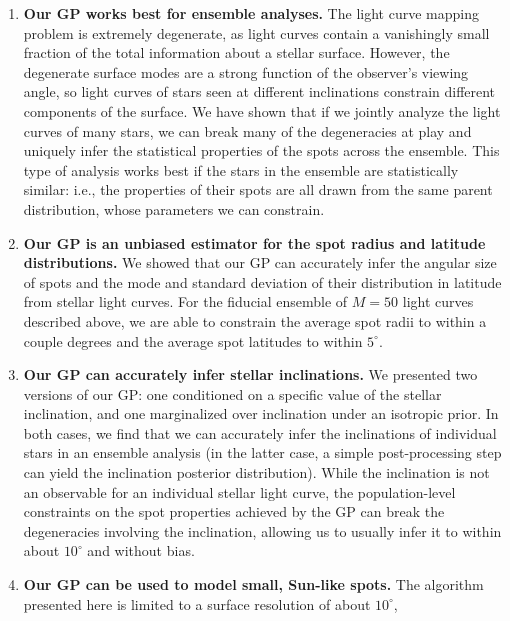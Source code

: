 \documentclass[modern]{aastex62}
\begin{document}
\begin{enumerate}
    \item \textbf{Our GP works best for ensemble analyses.} The light curve mapping
          problem is extremely degenerate, as light curves contain a vanishingly small
          fraction of the total information about a stellar surface. However, the
          degenerate surface modes are a strong function of the observer's viewing
          angle, so light curves of stars seen at different inclinations constrain
          different components of the surface. We have shown that if we jointly
          analyze the light curves of many stars,
          we can break many of the degeneracies at play and uniquely infer the
          statistical properties of the spots across the ensemble. This type
          of analysis works best if the stars in the ensemble are statistically
          similar: i.e., the properties of their spots are all drawn from the
          same parent distribution, whose parameters we can constrain.
    \item \textbf{Our GP is an unbiased estimator for the spot radius and
              latitude distributions.} We showed that our GP can accurately infer the
          angular size of spots and the mode and standard deviation of their
          distribution in latitude from stellar light curves. For the fiducial
          ensemble of $M = 50$ light curves described above, we are able to
          constrain the average spot radii to within a couple degrees and the
          average spot latitudes to within $5^\circ$.
    \item \textbf{Our GP can accurately infer stellar inclinations.} We presented
          two versions of our GP: one conditioned on a specific value of the stellar
          inclination, and one marginalized over inclination under an isotropic
          prior. In both cases, we find that we can accurately infer the inclinations
          of individual stars in an ensemble analysis (in the latter case, a
          simple post-processing step can yield the inclination posterior distribution).
          While the inclination is not an observable for an individual stellar light
          curve, the population-level constraints on the spot properties achieved
          by the GP can break the degeneracies involving the inclination, allowing
          us to usually infer it to within about $10^\circ$ and without bias.
    \item \textbf{Our GP can be used to model small, Sun-like spots.} The algorithm
          presented here is limited to a surface resolution of about $10^\circ$,

\end{enumerate}
\end{document}
